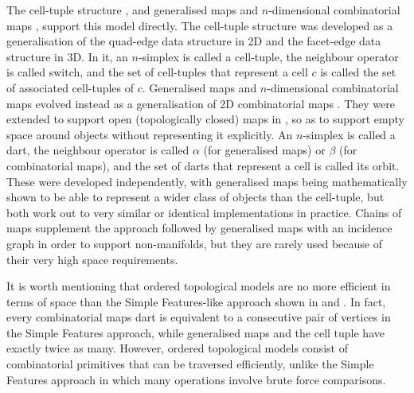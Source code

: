 The cell-tuple structure \citep{Brisson89}, and generalised maps and $n$-dimensional combinatorial maps \citep{Lienhardt94}, support this model directly.
The cell-tuple structure was developed as a generalisation of the quad-edge \citep{Guibas85} data structure in 2D and the facet-edge data structure \citep{Dobkin87} in 3D.
In it, an $n$-simplex is called a cell-tuple, the neighbour operator is called switch, and the set of cell-tuples that represent a cell $c$ is called the set of associated cell-tuples of $c$.
Generalised maps and $n$-dimensional combinatorial maps \citep{Lienhardt94} evolved instead as a generalisation of 2D combinatorial maps \citep{Edmonds60}.
They were extended to support open (topologically closed) maps in \citet{Poudret07}, so as to support empty space around objects without representing it explicitly.
An $n$-simplex is called a dart, the neighbour operator is called $\alpha$ (for generalised maps) or $\beta$ (for combinatorial maps), and the set of darts that represent a cell is called its orbit.
These were developed independently, with generalised maps being mathematically shown to be able to represent a wider class of objects than the cell-tuple, but both work out to very similar or identical implementations in practice.
Chains of maps \citep{Elter94} supplement the approach followed by generalised maps with an incidence graph in order to support non-manifolds, but they are rarely used because of their very high space requirements.

It is worth mentioning that ordered topological models are no more efficient in terms of space than the Simple Features-like \citep{SimpleFeatures1} approach shown in  and .
In fact, every combinatorial maps dart is equivalent to a consecutive pair of vertices in the Simple Features approach, while generalised maps and the cell tuple have exactly twice as many.
However, ordered topological models consist of combinatorial primitives that can be traversed efficiently, unlike the Simple Features approach in which many operations involve brute force comparisons.

